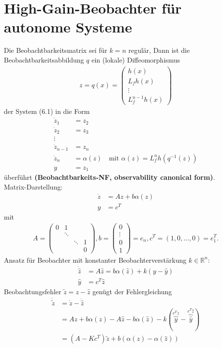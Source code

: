 \documentclass[ngerman]{tudscrreprt}
\begin{document}
\section{High-Gain-Beobachter für autonome Systeme}
Die Beobachtbarkeitsmatrix sei für $k=n$ regulär, Dann ist die Beobachtbarkeitsabbildung $q$ ein (lokale) Diffeomorphismus \begin{align*}
z=q(x) = \begin{pmatrix} h(x)\\ L_fh(x)\\ \vdots\\ L_f^{n-1}h(x)\end{pmatrix}
\end{align*}
der System (6.1) in die Form \begin{align*}
\dot z_1 &= z_2\\ \dot z_2 &= z_3\\ \vdots\\ \dot z_{n-1}&= z_n\\ \dot z_n &= \alpha(z) \quad \text{mit } \alpha(z) = L_f^n h(q^{-1}(z))\\y &= z_1 
\end{align*}
überführt \textbf{(Beobachtbarkeits-NF, observability canonical form)}. \\ 
Matrix-Darstellung: \begin{align*} \dot z &= Az + b\alpha(z)\\ y&= c^T \end{align*} mit \begin{align*} A = \begin{pmatrix} 0& 1 &&\\ &\ddots&&\\ &&\ddots&1\\ &&&0 \end{pmatrix}, b= \begin{pmatrix} 0\\ \vdots\\ 0\\1\end{pmatrix} =e_n, c^T = (1, 0,\dots, 0) = e_1^T.
\end{align*} 
Ansatz für Beobachter mit konstanter Beobachterverstärkung $k\in \mathbb{R}^n$: \begin{align*}
\dot{\hat z} &= A \hat z = b \alpha(\hat z) + k(y - \hat y)\\ 
\hat y &= c^T \hat z\end{align*} Beobachtungsfehler $\tilde z = z - \hat z$ genügt der Fehlergleichung \begin{align*}
\dot{\tilde z} & = \dot z - \dot{\hat z}\\ 
&= Az + b\alpha(z) - A \hat z - b\alpha(\hat z) - k(\overbrace{y}^{c^Tz} - \overbrace{\hat y}^{c^T\hat z})\\ 
&= (A -K c^T) \tilde z + b(\alpha(z) - \alpha(\hat z))
\end{align*}
\end{document}
